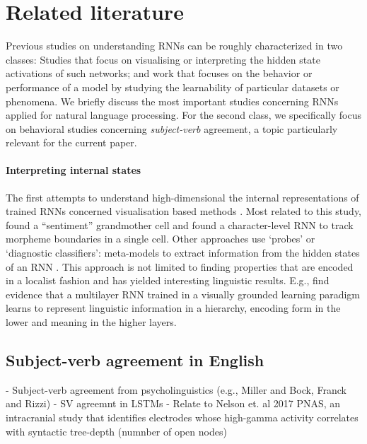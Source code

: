 
\section{Related literature}

Previous studies on understanding RNNs can be roughly characterized in two classes: Studies that focus on visualising or interpreting the hidden state activations of such networks; and work that focuses on the behavior or performance of a model by studying the learnability of particular datasets or phenomena.
We briefly discuss the most important studies concerning RNNs applied for natural language processing.
For the second class, we specifically focus on behavioral studies concerning \textit{subject-verb} agreement, a topic particularly relevant for the current paper.

\paragraph{Interpreting internal states}
The first attempts to understand high-dimensional the internal representations of trained RNNs concerned visualisation based methods \cite{Karpathy:etal:2016,tang2017memory,li2016visualizing,Radford:etal:2017}.
Most related to this study,  found a ``sentiment'' grandmother cell and  found a character-level RNN to track morpheme boundaries in a single cell.
Other approaches use `probes' or `diagnostic classifiers': meta-models to extract information from the hidden states of an RNN \cite{Adi:etal:2017,Hupkes:etal:2017,alain2017understanding}.
This approach is not limited to finding properties that are encoded in a localist fashion and has yielded interesting linguistic results.
E.g.,  find evidence that a multilayer RNN trained in a visually grounded learning paradigm learns to represent linguistic information in a hierarchy, encoding form in the lower and meaning in the higher layers.

\subsection{Subject-verb agreement in English}
- Subject-verb agreement from psycholinguistics (e.g., Miller and Bock, Franck and Rizzi)
- SV agreemnt in LSTMs \cite{Linzen:etal:2016,Bernardy:Lappin:2017,Gulordava:etal:2018,Kuncoro:etal:2018a,Kuncoro:etal:2018b,Linzen:Leonard:2018}
- Relate to Nelson et. al 2017 PNAS, an intracranial study that identifies electrodes whose high-gamma activity correlates with syntactic tree-depth (numnber of open nodes)
